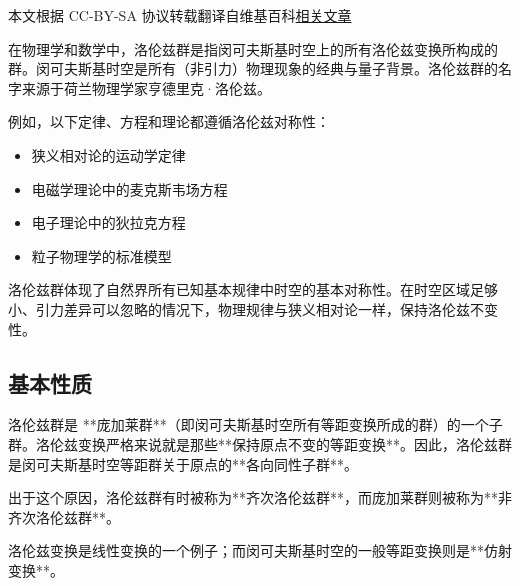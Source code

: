 
本文根据 CC-BY-SA 协议转载翻译自维基百科\href{https://en.wikipedia.org/wiki/Lorentz_group}{相关文章}

在物理学和数学中，洛伦兹群是指闵可夫斯基时空上的所有洛伦兹变换所构成的群。闵可夫斯基时空是所有（非引力）物理现象的经典与量子背景。洛伦兹群的名字来源于荷兰物理学家亨德里克·洛伦兹。

例如，以下定律、方程和理论都遵循洛伦兹对称性：
\begin{itemize}
\item 狭义相对论的运动学定律
\item 电磁学理论中的麦克斯韦场方程
\item 电子理论中的狄拉克方程
\item 粒子物理学的标准模型
\end{itemize}
洛伦兹群体现了自然界所有已知基本规律中时空的基本对称性。在时空区域足够小、引力差异可以忽略的情况下，物理规律与狭义相对论一样，保持洛伦兹不变性。
\subsection{基本性质}

洛伦兹群是 **庞加莱群**（即闵可夫斯基时空所有等距变换所成的群）的一个子群。洛伦兹变换严格来说就是那些**保持原点不变的等距变换**。因此，洛伦兹群是闵可夫斯基时空等距群关于原点的**各向同性子群**。

出于这个原因，洛伦兹群有时被称为**齐次洛伦兹群**，而庞加莱群则被称为**非齐次洛伦兹群**。

洛伦兹变换是线性变换的一个例子；而闵可夫斯基时空的一般等距变换则是**仿射变换**。
